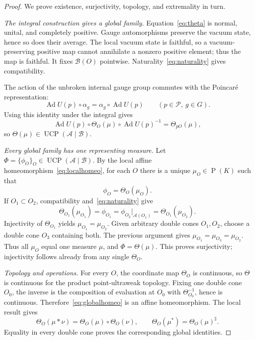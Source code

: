 \documentclass[11pt]{article}
\newcommand{\A}{\mathcal A}
\newcommand{\Bnet}{\mathcal B}
\newcommand{\UCP}{\operatorname{UCP}}
\newcommand{\Prob}{\operatorname{P}}
\newcommand{\Ad}{\operatorname{Ad}}
\begin{document}
\begin{proof}
We prove existence, surjectivity, topology, and extremality in turn.

\smallskip\noindent
\emph{The integral construction gives a global family.}
Equation~\eqref{eq:theta} is normal, unital, and completely positive.  Gauge
automorphisms preserve the vacuum state, hence so does their average.  The
local vacuum state is faithful, so a vacuum-preserving positive map cannot
annihilate a nonzero positive element; thus the map is faithful.  It fixes
$\Bnet(O)$ pointwise.  Naturality~\eqref{eq:naturality} gives compatibility.

The action of the unbroken internal gauge group commutes with the Poincar\'e
representation:
\[
 \Ad U(p)\circ\alpha_g=\alpha_g\circ\Ad U(p)
 \qquad(p\in\mathcal P,\ g\in G).
\]
Using this identity under the integral gives
\[
 \Ad U(p)\circ\Theta_O(\mu)\circ\Ad U(p)^{-1}
      =\Theta_{pO}(\mu),
\]
so $\Theta(\mu)\in\UCP(\A\mid\Bnet)$.

\smallskip\noindent
\emph{Every global family has one representing measure.}
Let $\Phi=\{\phi_O\}_O\in\UCP(\A\mid\Bnet)$.  By the local affine
homeomorphism~\eqref{eq:localhomeo}, for each $O$ there is a unique
$\mu_O\in\Prob(K)$ such that
\[
                    \phi_O=\Theta_O(\mu_O).
\]
If $O_1\subset O_2$, compatibility and~\eqref{eq:naturality} give
\[
 \Theta_{O_1}(\mu_{O_1})=\phi_{O_1}
 =\phi_{O_2}|_{\A(O_1)}
 =\Theta_{O_1}(\mu_{O_2}).
\]
Injectivity of $\Theta_{O_1}$ yields $\mu_{O_1}=\mu_{O_2}$.  Given arbitrary
double cones $O_1,O_2$, choose a double cone $O_3$ containing both.  The
previous argument gives $\mu_{O_1}=\mu_{O_3}=\mu_{O_2}$.  Thus all $\mu_O$
equal one measure $\mu$, and $\Phi=\Theta(\mu)$.  This proves surjectivity;
injectivity follows already from any single $\Theta_O$.

\smallskip\noindent
\emph{Topology and operations.}
For every $O$, the coordinate map $\Theta_O$ is continuous, so $\Theta$ is
continuous for the product point-ultraweak topology.  Fixing one double cone
$O_0$, the inverse is the composition of evaluation at $O_0$ with
$\Theta_{O_0}^{-1}$, hence is continuous.  Therefore~\eqref{eq:globalhomeo}
is an affine homeomorphism.  The local result gives
\[
 \Theta_O(\mu*\nu)=\Theta_O(\mu)\circ\Theta_O(\nu),
 \qquad
 \Theta_O(\mu^*)=\Theta_O(\mu)^{\sharp}.
\]
Equality in every double cone proves the corresponding global identities.


\end{proof}
\end{document}
